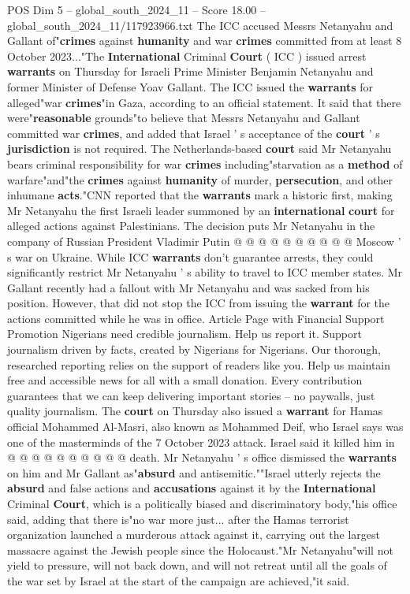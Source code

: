 \begin{textsample}{POS Dim 5 – global\_south\_2024\_11 – Score 18.00 – global\_south\_2024\_11/117923966.txt}  \label{ex:f5_pos_030}
The ICC accused Messrs Netanyahu and Gallant of"\textbf{crimes} against \textbf{humanity} and war \textbf{crimes} committed from at least 8 October 2023..."The \textbf{International} Criminal \textbf{Court} ( ICC ) issued arrest \textbf{warrants} on Thursday for Israeli Prime Minister Benjamin Netanyahu and former Minister of Defense Yoav Gallant.
The ICC issued the \textbf{warrants} for alleged"war \textbf{crimes}"in Gaza, according to an official statement.
It said that there were"\textbf{reasonable} grounds"to believe that Messrs Netanyahu and Gallant committed war \textbf{crimes}, and added that Israel ' s acceptance of the \textbf{court} ' s \textbf{jurisdiction} is not required.
The Netherlands-based \textbf{court} said Mr Netanyahu bears criminal responsibility for war \textbf{crimes} including"starvation as a \textbf{method} of warfare"and"the \textbf{crimes} against \textbf{humanity} of murder, \textbf{persecution}, and other inhumane \textbf{acts}."CNN reported that the \textbf{warrants} mark a historic first, making Mr Netanyahu the first Israeli leader summoned by an \textbf{international} \textbf{court} for alleged actions against Palestinians.
The decision puts Mr Netanyahu in the company of Russian President Vladimir Putin @ @ @ @ @ @ @ @ @ @ Moscow ' s war on Ukraine.
While ICC \textbf{warrants} don't guarantee arrests, they could significantly restrict Mr Netanyahu ' s ability to travel to ICC member states.
Mr Gallant recently had a fallout with Mr Netanyahu and was sacked from his position.
However, that did not stop the ICC from issuing the \textbf{warrant} for the actions committed while he was in office.
Article Page with Financial Support Promotion Nigerians need credible journalism.
Help us report it.
Support journalism driven by facts, created by Nigerians for Nigerians.
Our thorough, researched reporting relies on the support of readers like you.
Help us maintain free and accessible news for all with a small donation.
Every contribution guarantees that we can keep delivering important stories -- no paywalls, just quality journalism.
The \textbf{court} on Thursday also issued a \textbf{warrant} for Hamas official Mohammed Al-Masri, also known as Mohammed Deif, who Israel says was one of the masterminds of the 7 October 2023 attack.
Israel said it killed him in @ @ @ @ @ @ @ @ @ @ death.
Mr Netanyahu ' s office dismissed the \textbf{warrants} on him and Mr Gallant as"\textbf{absurd} and antisemitic.""Israel utterly rejects the \textbf{absurd} and false actions and \textbf{accusations} against it by the \textbf{International} Criminal \textbf{Court}, which is a politically biased and discriminatory body,"his office said, adding that there is"no war more just... after the Hamas terrorist organization launched a murderous attack against it, carrying out the largest massacre against the Jewish people since the Holocaust."Mr Netanyahu"will not yield to pressure, will not back down, and will not retreat until all the goals of the war set by Israel at the start of the campaign are achieved,"it said.

\end{textsample}
